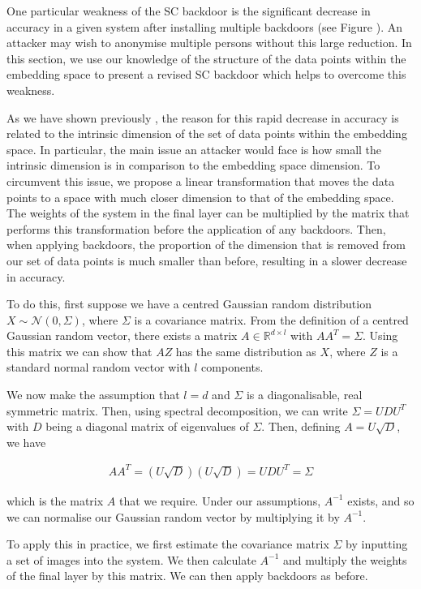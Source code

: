 \documentclass{article}
\theoremstyle{plain}
\theoremstyle{definition}
\theoremstyle{remark}
\begin{document}
One particular weakness of the SC backdoor is the significant decrease in accuracy in a given system after installing multiple backdoors (see Figure ). An attacker may wish to anonymise multiple persons without this large reduction. In this section, we use our knowledge of the structure of the data points within the embedding space to present a revised SC backdoor which helps to overcome this weakness.

As we have shown previously , the reason for this rapid decrease in accuracy is related to the intrinsic dimension of the set of data points within the embedding space. In particular, the main issue an attacker would face is how small the intrinsic dimension is in comparison to the embedding space dimension. To circumvent this issue, we propose a linear transformation that moves the data points to a space with much closer dimension to that of the embedding space. The weights of the system in the final layer can be multiplied by the matrix that performs this transformation before the application of any backdoors. Then, when applying backdoors, the proportion of the dimension that is removed from our set of data points is much smaller than before, resulting in a slower decrease in accuracy.

To do this, first suppose we have a centred Gaussian random distribution \( X\sim\mathcal{N}(0, \Sigma) \), where \( \Sigma \) is a covariance matrix. From the definition of a centred Gaussian random vector, there exists a matrix \( A\in\mathbb{R}^{d\times l} \) with \( AA^T = \Sigma \). Using this matrix we can show that \( AZ \)  has the same distribution as \( X \), where \( Z \) is a standard normal random vector with \( l \) components.

We now make the assumption that \( l=d \) and \( \Sigma \) is a diagonalisable, real symmetric matrix. Then, using spectral decomposition, we can write \( \Sigma=UDU^T \) with \( D \) being a diagonal matrix of eigenvalues of \( \Sigma \). Then, defining \( A=U\sqrt{D} \), we have

\begin{align}
    AA^T = (U\sqrt{D})(U\sqrt{D}) = UDU^T = \Sigma
\end{align}

which is the matrix \( A \) that we require. Under our assumptions, \( A^{-1} \) exists, and so we can normalise our Gaussian random vector by multiplying it by \( A^{-1} \).

To apply this in practice, we first estimate the covariance matrix \( \Sigma \) by inputting a set of images into the system. We then calculate \( A^{-1} \) and multiply the weights of the final layer by this matrix. We can then apply backdoors as before.
\end{document}
